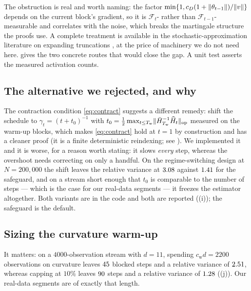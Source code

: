 The obstruction is real and worth naming: the factor
$\min\{1,c_D(1+\lVert \theta_{t-1} \rVert)/\lVert v \rVert\}$ depends on the current block's gradient, so it is
$\mathcal F_t$- rather than $\mathcal F_{t-1}$-measurable and correlates with the noise, which
breaks the martingale structure the proofs use. A complete treatment is available in the
stochastic-approximation literature on expanding truncations
\citep{andrieu2005stability,kushner2003stochastic}, at the price of machinery we do not need here.
 gives the two concrete routes that would close the gap. A unit test asserts the
measured activation counts.

\subsection{The alternative we rejected, and why}
\label{app:rejected}

The contraction condition \eqref{eq:contract} suggests a different
remedy: shift the schedule to $\gamma_t=(t+t_0)^{-1}$ with
$t_0=\tfrac12\max_{t\le T_{\mathrm w}}\lVert \bar{H}_{T_{\mathrm w}}^{-1}\widehat H_t \rVert_{\mathrm{op}}$ measured on the warm-up blocks, which
makes \eqref{eq:contract} hold at $t=1$ by construction and has a cleaner proof (it is a finite
deterministic reindexing; see ). We implemented it and it is worse, for a reason
worth stating: it slows \emph{every} step, whereas the overshoot needs correcting on only a
handful. On the regime-switching design at $N=200{,}000$ the shift leaves the relative variance at
$3.08$ against $1.41$ for the safeguard, and on a stream short enough
that $t_0$ is comparable to the number of steps --- which is the case for our real-data segments --- it freezes the estimator
altogether. Both variants are in the code and both are reported
((i)); the safeguard is the default.



\subsection{Sizing the curvature warm-up}
\label{app:warmup}

It matters: on a $4000$-observation stream with $d=11$, spending $c_{\mathrm w}d=2200$
observations on curvature leaves $45$ blocked steps and a relative variance of
$2.51$, whereas capping at $10\%$ leaves $90$ steps and a
relative variance of $1.28$ ((j)). Our real-data segments are of exactly that length.

